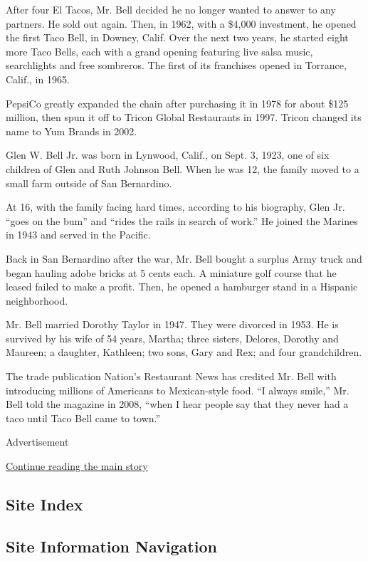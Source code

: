 After four El Tacos, Mr. Bell decided he no longer wanted to answer to
any partners. He sold out again. Then, in 1962, with a \$4,000
investment, he opened the first Taco Bell, in Downey, Calif. Over the
next two years, he started eight more Taco Bells, each with a grand
opening featuring live salsa music, searchlights and free sombreros. The
first of its franchises opened in Torrance, Calif., in 1965.

PepsiCo greatly expanded the chain after purchasing it in 1978 for about
\$125 million, then spun it off to Tricon Global Restaurants in 1997.
Tricon changed its name to Yum Brands in 2002.

Glen W. Bell Jr. was born in Lynwood, Calif., on Sept. 3, 1923, one of
six children of Glen and Ruth Johnson Bell. When he was 12, the family
moved to a small farm outside of San Bernardino.

At 16, with the family facing hard times, according to his biography,
Glen Jr. ``goes on the bum'' and ``rides the rails in search of work.''
He joined the Marines in 1943 and served in the Pacific.

Back in San Bernardino after the war, Mr. Bell bought a surplus Army
truck and began hauling adobe bricks at 5 cents each. A miniature golf
course that he leased failed to make a profit. Then, he opened a
hamburger stand in a Hispanic neighborhood.

Mr. Bell married Dorothy Taylor in 1947. They were divorced in 1953. He
is survived by his wife of 54 years, Martha; three sisters, Delores,
Dorothy and Maureen; a daughter, Kathleen; two sons, Gary and Rex; and
four grandchildren.

The trade publication Nation's Restaurant News has credited Mr. Bell
with introducing millions of Americans to Mexican-style food. ``I always
smile,'' Mr. Bell told the magazine in 2008, ``when I hear people say
that they never had a taco until Taco Bell came to town.''

Advertisement

\protect\hyperlink{after-bottom}{Continue reading the main story}

\hypertarget{site-index}{%
\subsection{Site Index}\label{site-index}}

\hypertarget{site-information-navigation}{%
\subsection{Site Information
Navigation}\label{site-information-navigation}}


